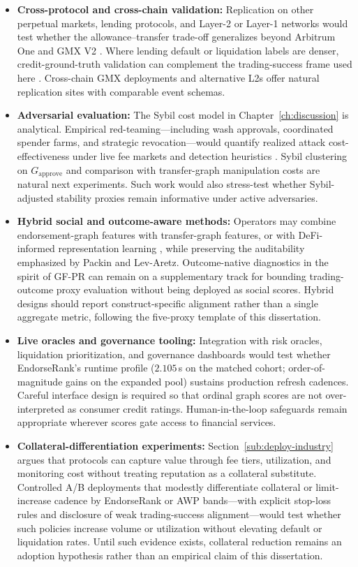 \begin{itemize}
\item \textbf{Cross-protocol and cross-chain validation:} Replication on other perpetual markets, lending protocols, and Layer-2 or Layer-1 networks would test whether the allowance--transfer trade-off generalizes beyond Arbitrum One and GMX V2 . Where lending default or liquidation labels are denser, credit-ground-truth validation can complement the trading-success frame used here . Cross-chain GMX deployments and alternative L2s offer natural replication sites with comparable event schemas.

\item \textbf{Adversarial evaluation:} The Sybil cost model in Chapter~\ref{ch:discussion} is analytical. Empirical red-teaming---including wash approvals, coordinated spender farms, and strategic revocation---would quantify realized attack cost-effectiveness under live fee markets and detection heuristics . Sybil clustering on $G_{\text{approve}}$ and comparison with transfer-graph manipulation costs are natural next experiments. Such work would also stress-test whether Sybil-adjusted stability proxies remain informative under active adversaries.

\item \textbf{Hybrid social and outcome-aware methods:} Operators may combine endorsement-graph features with transfer-graph features, or with DeFi-informed representation learning , while preserving the auditability emphasized by Packin and Lev-Aretz. Outcome-native diagnostics in the spirit of GF-PR can remain on a supplementary track for bounding trading-outcome proxy evaluation without being deployed as social scores. Hybrid designs should report construct-specific alignment rather than a single aggregate metric, following the five-proxy template of this dissertation.

\item \textbf{Live oracles and governance tooling:} Integration with risk oracles, liquidation prioritization, and governance dashboards would test whether EndorseRank's runtime profile ($2.105$\,s on the matched cohort; order-of-magnitude gains on the expanded pool) sustains production refresh cadences. Careful interface design is required so that ordinal graph scores are not over-interpreted as consumer credit ratings. Human-in-the-loop safeguards remain appropriate wherever scores gate access to financial services.

\item \textbf{Collateral-differentiation experiments:} Section~\ref{sub:deploy-industry} argues that protocols can capture value through fee tiers, utilization, and monitoring cost without treating reputation as a collateral substitute. Controlled A/B deployments that modestly differentiate collateral or limit-increase cadence by EndorseRank or AWP bands---with explicit stop-loss rules and disclosure of weak trading-success alignment---would test whether such policies increase volume or utilization without elevating default or liquidation rates. Until such evidence exists, collateral reduction remains an adoption hypothesis rather than an empirical claim of this dissertation.


\end{itemize}
